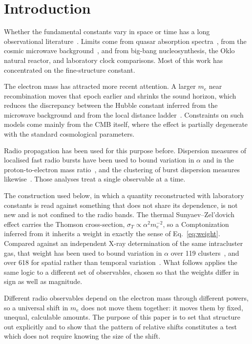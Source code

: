 \documentclass[aps,prd,twocolumn,superscriptaddress,nofootinbib,10pt]{revtex4-2}
\begin{document}
\section{Introduction}\label{sec:intro}

Whether the fundamental constants vary in space or time has a long observational
literature~\cite{Uzan2003,Uzan2011}. Limits come from quasar absorption
spectra~\cite{Webb1999,MurphyWebbFlambaum2003}, from the cosmic microwave
background~\cite{PlanckVaryingConstants,HartChluba2018}, and from big-bang nucleosynthesis, the
Oklo natural reactor, and laboratory clock comparisons. Most of this work has concentrated on the
fine-structure constant.

The electron mass has attracted more recent attention. A larger $m_e$ near recombination moves that
epoch earlier and shrinks the sound horizon, which reduces the discrepancy between the Hubble
constant inferred from the microwave background and from the local distance
ladder~\cite{Sekiguchi2021,HartChluba2018}. Constraints on such models come mainly from the CMB
itself, where the effect is partially degenerate with the standard cosmological parameters.

Radio propagation has been used for this purpose before. Dispersion measures of localised fast
radio bursts have been used to bound variation in $\alpha$ and in the proton-to-electron mass
ratio~\cite{Kalita2024}, and the clustering of burst dispersion measures likewise~\cite{WangXia2025}.
Those analyses treat a single observable at a time.

The construction used below, in which a quantity reconstructed with laboratory constants is read
against something that does not share its dependence, is not new and is not confined to the radio
bands. The thermal Sunyaev--Zel'dovich effect carries the Thomson cross-section,
$\sigma_T \propto \alpha^{2} m_e^{-2}$, so a Comptonization inferred from it inherits a weight in
exactly the sense of Eq.~\eqref{eq:weight}. Compared against an independent X-ray determination of
the same intracluster gas, that weight has been used to bound variation in $\alpha$ over 119
clusters~\cite{LiuAlphaClusters2021}, and over 618 for spatial rather than temporal
variation~\cite{deMartinoAlphaClusters2016}. What follows applies the same logic to a different set
of observables, chosen so that the weights differ in sign as well as magnitude.

Different radio observables depend on the electron mass through different powers, so a universal
shift in $m_e$ does not move them together: it moves them by fixed, unequal, calculable amounts. The
purpose of this paper is to set that structure out explicitly and to show that the pattern of
relative shifts constitutes a test which does not require knowing the size of the shift.
\end{document}
